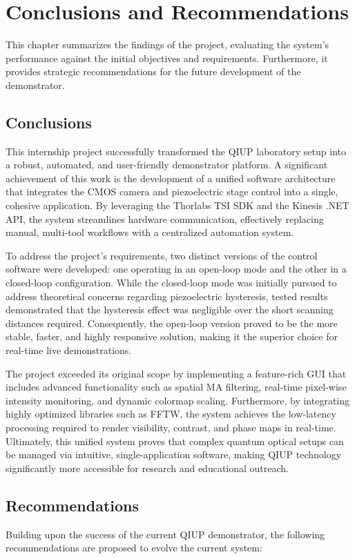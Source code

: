 \documentclass[12pt,a4paper]{article}
\begin{document}
\newpage
\section{Conclusions and Recommendations}
This chapter summarizes the findings of the project, evaluating the system's performance against the initial objectives and requirements. Furthermore, it provides strategic recommendations for the future development of the demonstrator.

\subsection{Conclusions}
This internship project successfully transformed the \ac{QIUP} laboratory setup into a robust, automated, and user-friendly demonstrator platform. A significant achievement of this work is the development of a unified software architecture that integrates the \ac{CMOS} camera and piezoelectric stage control into a single, cohesive application. By leveraging the Thorlabs \ac{TSI} \ac{SDK} and the Kinesis .NET API, the system streamlines hardware communication, effectively replacing manual, multi-tool workflows with a centralized automation system.

To address the project's requirements, two distinct versions of the control software were developed: one operating in an open-loop mode and the other in a closed-loop configuration. While the closed-loop mode was initially pursued to address theoretical concerns regarding piezoelectric hysteresis, tested results demonstrated that the hysteresis effect was negligible over the short scanning distances required. Consequently, the open-loop version proved to be the more stable, faster, and highly responsive solution, making it the superior choice for real-time live demonstrations.

The project exceeded its original scope by implementing a feature-rich \ac{GUI} that includes advanced functionality such as spatial \ac{MA} filtering, real-time pixel-wise intensity monitoring, and dynamic colormap scaling. Furthermore, by integrating highly optimized libraries such as \ac{FFTW}, the system achieves the low-latency processing required to render visibility, contrast, and phase maps in real-time. Ultimately, this unified system proves that complex quantum optical setups can be managed via intuitive, single-application software, making \ac{QIUP} technology significantly more accessible for research and educational outreach.

\subsection{Recommendations}
Building upon the success of the current \ac{QIUP} demonstrator, the following recommendations are proposed to evolve the current system:
\end{document}
